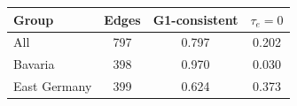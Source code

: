 \begin{tabular}{@{}lccc@{}}
\toprule
Group & Edges & G1-consistent & $\tau_e=0$ \\
\midrule
All & 797 & 0.797 & 0.202 \\
Bavaria & 398 & 0.970 & 0.030 \\
East Germany & 399 & 0.624 & 0.373 \\
\bottomrule
\end{tabular}
